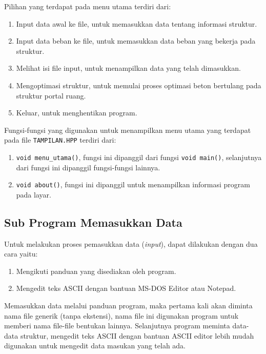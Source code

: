 Pilihan yang terdapat pada menu utama terdiri dari:
\begin{enumerate}[label=\arabic*.]
\item Input data awal ke file, untuk memasukkan data tentang informasi struktur.
\item Input data beban ke file, untuk memasukkan data beban yang bekerja pada struktur.
\item Melihat isi file input, untuk menampilkan data yang telah dimasukkan.
\item Mengoptimasi struktur, untuk memulai proses optimasi beton bertulang pada struktur portal ruang.
\item Keluar, untuk menghentikan program.
\end{enumerate}
Fungsi-fungsi yang digunakan untuk menampilkan menu utama yang terdapat
pada file \texttt{TAMPILAN.HPP} terdiri dari:
\begin{enumerate}[label=\arabic*.]
\item \texttt{void menu\_utama()}, fungsi ini dipanggil dari fungsi
      \texttt{void main()}, selanjutnya dari fungsi ini dipanggil
      fungsi-fungsi lainnya.
\item \texttt{void about()}, fungsi ini dipanggil untuk menampilkan
      informasi program pada layar.
\end{enumerate}

\subsection{Sub Program Memasukkan Data}

Untuk melakukan proses pemasukkan data (\textit{input}), dapat dilakukan
dengan dua cara yaitu:
\begin{enumerate}[label=\arabic*.]
\item Mengikuti panduan yang disediakan oleh program.
\item Mengedit teks ASCII dengan bantuan MS-DOS Editor atau Notepad.
\end{enumerate}
Memasukkan data melalui panduan program, maka pertama kali akan diminta
nama file generik (tanpa ekstensi), nama file ini digunakan program untuk
memberi nama file-file bentukan lainnya. Selanjutnya program meminta
data-data struktur, mengedit teks ASCII dengan bantuan ASCII editor lebih
mudah digunakan untuk mengedit data masukan yang telah ada.

